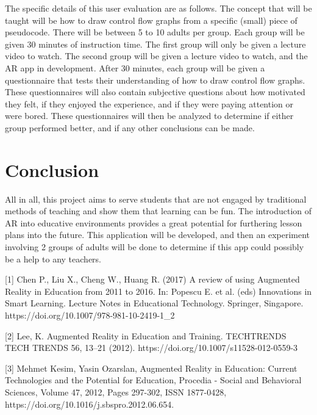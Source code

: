\documentclass{vgtc}                          %
\begin{document}
	
	The specific details of this user evaluation are as follows. The concept that will be taught will be how to draw control flow graphs from a specific (small) piece of pseudocode. There will be between 5 to 10 adults per group. Each group will be given 30 minutes of instruction time. The first group will only be given a lecture video to watch. The second group will be given a lecture video to watch, and the AR app in development. After 30 minutes, each group will be given a questionnaire that tests their understanding of how to draw control flow graphs. These questionnaires will also contain subjective questions about how motivated they felt, if they enjoyed the experience, and if they were paying attention or were bored. These questionnaires will then be analyzed to determine if either group performed better, and if any other conclusions can be made.



\section{Conclusion}

All in all, this project aims to serve students that are not engaged by traditional methods of teaching and show them that learning can be fun. The introduction of AR into educative environments provides a great potential for furthering lesson plans into the future. This application will be developed, and then an experiment involving 2 groups of adults will be done to determine if this app could possibly be a help to any teachers. 



%

%
%
%



[1] Chen P., Liu X., Cheng W., Huang R. (2017) A review of using Augmented Reality in Education from 2011 to 2016. In: Popescu E. et al. (eds) Innovations in Smart Learning. Lecture Notes in Educational Technology. Springer, Singapore. https://doi.org/10.1007/978-981-10-2419-1_2

[2] Lee, K. Augmented Reality in Education and Training. TECHTRENDS TECH TRENDS 56, 13–21 (2012). https://doi.org/10.1007/s11528-012-0559-3

[3] Mehmet Kesim, Yasin Ozarslan, Augmented Reality in Education: Current Technologies and the Potential for Education, Procedia - Social and Behavioral Sciences, Volume 47, 2012, Pages 297-302, ISSN 1877-0428, https://doi.org/10.1016/j.sbspro.2012.06.654.
\end{document}
